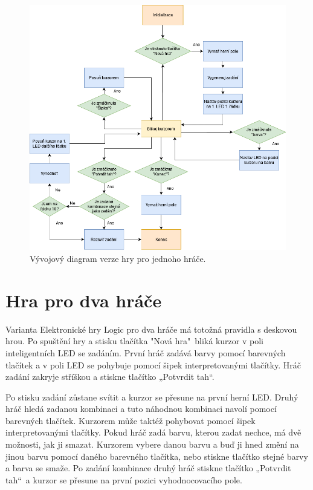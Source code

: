 \begin{figure}[!h]
    \begin{center}
        \includegraphics[scale=0.55]{obrazky/vyvojovy_diagram_1_hrac.png}
    \end{center}
    \caption[Vývojový diagram verze hry pro jednoho hráče]{Vývojový diagram verze hry pro jednoho hráče.}
    \end{figure}

\section{Hra pro dva hráče}
Varianta Elektronické hry Logic pro dva hráče má totožná pravidla s deskovou hrou. Po spuštění hry a stisku tlačítka "Nová hra"\ bliká 
kurzor v poli inteligentních LED se zadáním. První hráč zadává barvy pomocí barevných tlačítek a v poli LED se pohybuje pomocí šipek 
interpretovanými tlačítky. Hráč zadání zakryje stříškou a stiskne tlačítko „Potvrdit tah“. 

Po stisku zadání zůstane svítit a kurzor se přesune na první herní LED. Druhý hráč hledá zadanou kombinaci a tuto náhodnou kombinaci 
navolí pomocí barevných tlačítek. Kurzorem může taktéž pohybovat pomocí šipek interpretovanými tlačítky.
Pokud hráč zadá barvu, kterou zadat nechce, má dvě možnosti,
jak ji smazat. Kurzorem vybere danou barvu a buď ji hned změní na jinou barvu pomocí daného barevného tlačítka, nebo stiskne tlačítko 
stejné barvy a barva se smaže. Po zadání kombinace 
druhý hráč stiskne tlačítko „Potvrdit tah“\  a kurzor se přesune na první pozici vyhodnocovacího pole. 

